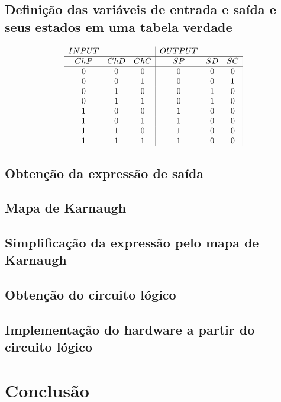 \documentclass{article}
\begin{document}
\subsection{Definição das variáveis de entrada e saída e seus estados em uma tabela verdade}
\begin{displaymath}
\begin{array}{|c c c|c c c|}
INPUT & & & OUTPUT &\\
\hline
ChP & ChD & ChC & SP & SD & SC\\
\hline %
0 & 0 & 0 & 0 & 0 & 0\\
0 & 0 & 1 & 0 & 0 & 1\\
0 & 1 & 0 & 0 & 1 & 0\\
0 & 1 & 1 & 0 & 1 & 0\\
1 & 0 & 0 & 1 & 0 & 0\\
1 & 0 & 1 & 1 & 0 & 0\\
1 & 1 & 0 & 1 & 0 & 0\\
1 & 1 & 1 & 1 & 0 & 0\\
\end{array}
\end{displaymath}

\subsection{Obtenção da expressão de saída}

\subsection{Mapa de Karnaugh}

\subsection{Simplificação da expressão pelo mapa de Karnaugh}

\subsection{Obtenção do circuito lógico}

\subsection{Implementação do hardware a partir do circuito lógico}

\section{Conclusão}


\medskip
\end{document}

